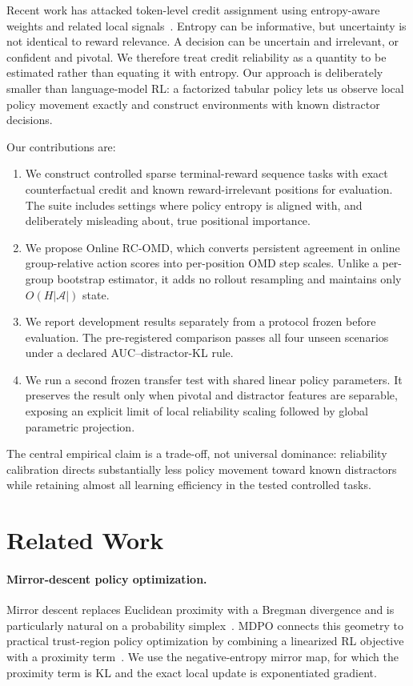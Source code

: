 \documentclass[10pt]{article}
\newcommand{\A}{\mathcal{A}}
\newcommand{\method}{Online RC-OMD}
\begin{document}
Recent work has attacked token-level credit assignment using entropy-aware
weights and related local signals~\cite{he2026eapo,xie2026acpo}.  Entropy can be
informative, but uncertainty is not identical to reward relevance.  A decision
can be uncertain and irrelevant, or confident and pivotal.  We therefore treat
credit reliability as a quantity to be estimated rather than equating it with
entropy.  Our approach is deliberately smaller than language-model RL: a
factorized tabular policy lets us observe local policy movement exactly and
construct environments with known distractor decisions.

Our contributions are:
\begin{enumerate}
    \item We construct controlled sparse terminal-reward sequence tasks with
    exact counterfactual credit and known reward-irrelevant positions for
    evaluation.  The suite includes settings where policy entropy is aligned
    with, and deliberately misleading about, true positional importance.
    \item We propose \method, which converts persistent agreement in online
    group-relative action scores into per-position OMD step scales.  Unlike a
    per-group bootstrap estimator, it adds no rollout resampling and maintains
    only $O(H|\A|)$ state.
    \item We report development results separately from a protocol frozen
    before evaluation.  The pre-registered comparison passes all four unseen
    scenarios under a declared AUC--distractor-KL rule.
    \item We run a second frozen transfer test with shared linear policy
    parameters.  It preserves the result only when pivotal and distractor
    features are separable, exposing an explicit limit of local reliability
    scaling followed by global parametric projection.
\end{enumerate}

The central empirical claim is a trade-off, not universal dominance: reliability
calibration directs substantially less policy movement toward known distractors
while retaining almost all learning efficiency in the tested controlled tasks.

\section{Related Work}

\paragraph{Mirror-descent policy optimization.}
Mirror descent replaces Euclidean proximity with a Bregman divergence and is
particularly natural on a probability simplex~\cite{beck2003mirror}.  MDPO
connects this geometry to practical trust-region policy optimization by
combining a linearized RL objective with a proximity term~\cite{tomar2020mdpo}.
We use the negative-entropy mirror map, for which the proximity term is KL and
the exact local update is exponentiated gradient.
\end{document}
